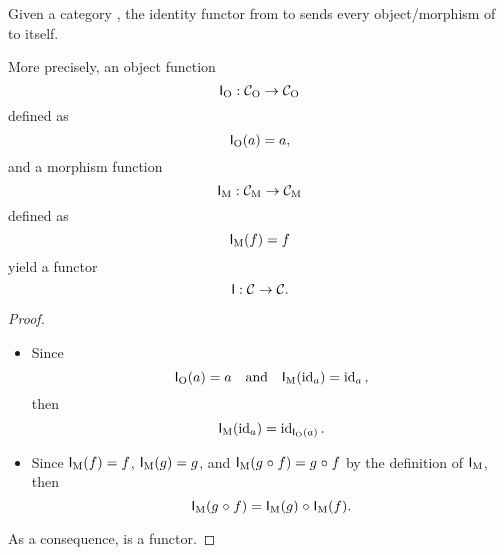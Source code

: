 \begin{example}[Identity]

  \label{ex:functor-identity}


  Given a category , the identity functor from  to
   sends every object/morphism of  to itself.

  More precisely, an object function
  \begin{equation*}
    \mathsf{I}_{\operatorname{O}}: \mathcal{C}_{\operatorname{O}} \to \mathcal{C}_{\operatorname{O}}
  \end{equation*}
  defined as
  \begin{equation}
    \label{eq:funcO-id}
    \mathsf{I}_{\operatorname{O}}(a) = a
    \text{,}
  \end{equation}
  and a morphism function
  \begin{equation*}
    \mathsf{I}_{\operatorname{M}}: \mathcal{C}_{\operatorname{M}} \to \mathcal{C}_{\operatorname{M}}
  \end{equation*}
  defined as
  \begin{equation}
    \label{eq:funcM-id-b}
    \mathsf{I}_{\operatorname{M}}(f) = f
  \end{equation}
  yield a functor
  \begin{equation*}
    \mathsf{I}: \mathcal{C} \to \mathcal{C}
    \text{.}
  \end{equation*}
  \begin{proof}
    \hfill
    \begin{itemize}
    \item
      Since
      \begin{equation*}
        \mathsf{I}_{\operatorname{O}}(a) = a
        \quad
        \text{and}
        \quad
        \mathsf{I}_{\operatorname{M}}(\operatorname{id}_{a}) = \operatorname{id}_{a}
        \text{,}
      \end{equation*}
      then
      \begin{equation*}
        \mathsf{I}_{\operatorname{M}}(\operatorname{id}_{a}) = \operatorname{id}_{\mathsf{I}_{\operatorname{O}}(a)}
        \text{.}
      \end{equation*}
    \item
      Since $\mathsf{I}_{\operatorname{M}}(f) = f$, $\mathsf{I}_{\operatorname{M}}(g) = g$, and
      $\mathsf{I}_{\operatorname{M}}(g \mathrel{\circ} f) = g \mathrel{\circ} f$ by the definition of
      $\mathsf{I}_{\operatorname{M}}$, then
      \begin{equation*}
        \mathsf{I}_{\operatorname{M}}(g \mathrel{\circ} f) = \mathsf{I}_{\operatorname{M}}(g) \mathrel{\circ} \mathsf{I}_{\operatorname{M}}(f)
        \text{.}
      \end{equation*}
    \end{itemize}
    As a consequence,  is a functor.
  \end{proof}

\end{example}

